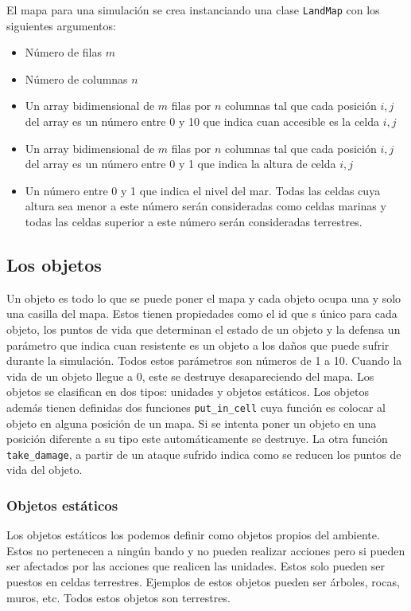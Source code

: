 El mapa para una simulaci\'on se crea instanciando una clase \verb|LandMap| con los siguientes argumentos:

\begin{itemize}
	\item N\'umero de filas $m$
	\item N\'umero de columnas $n$
	\item Un array bidimensional de $m$ filas por $n$ columnas tal que cada posici\'on $i,j$ del array es un n\'umero entre 0 y 10 que indica cuan accesible es la celda $i,j$
	\item Un array bidimensional de $m$ filas por $n$ columnas tal que cada posici\'on $i,j$ del array es un n\'umero entre 0 y 1 que indica la altura de celda $i,j$
	\item Un n\'umero entre 0 y 1 que indica el nivel del mar. Todas las celdas cuya altura sea menor a este n\'umero ser\'an consideradas como celdas marinas y todas las celdas superior a este n\'umero ser\'an consideradas terrestres.
\end{itemize}

\subsection{Los objetos}

Un objeto es todo lo que se puede poner el mapa y cada objeto ocupa una y solo una casilla del mapa. Estos tienen propiedades como el id que s \'unico para cada objeto, los puntos de vida que determinan el estado de un objeto y la defensa un par\'ametro que indica cuan resistente es un objeto a los da\~{n}os que puede sufrir durante la simulaci\'on. Todos estos par\'ametros son n\'umeros de 1 a 10. Cuando la vida de un objeto llegue a 0, este se destruye desapareciendo del mapa. Los objetos se clasifican en dos tipos: unidades y objetos est\'aticos. Los objetos adem\'as tienen definidas dos funciones \verb|put_in_cell| cuya funci\'on es colocar al objeto en alguna posici\'on de un mapa. Si se intenta poner un objeto en una posici\'on diferente a su tipo este autom\'aticamente se destruye. La otra funci\'on \verb|take_damage|, a partir de un ataque sufrido indica como se reducen los puntos de vida del objeto.

\subsubsection{Objetos est\'aticos}

Los objetos est\'aticos los podemos definir como objetos propios del ambiente. Estos no pertenecen a ning\'un bando y no pueden realizar acciones pero si pueden ser afectados por las acciones que realicen las unidades. Estos solo pueden ser puestos en celdas terrestres. Ejemplos de estos objetos pueden ser \'arboles, rocas, muros, etc. Todos estos objetos son terrestres. 

